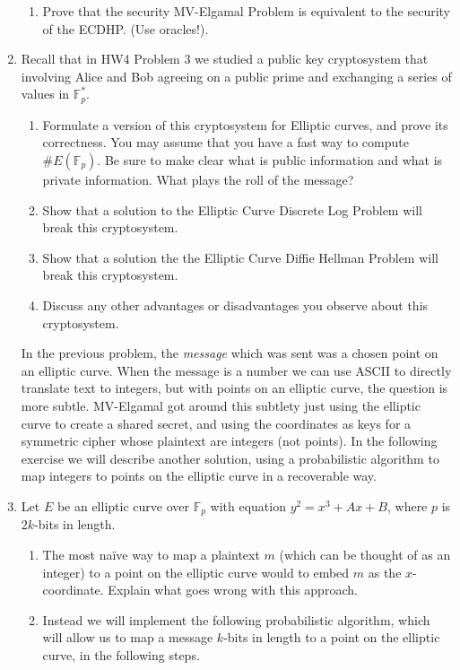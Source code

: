\documentclass[11pt]{article}
\newcommand{\bF}{\mathbb{F}}
\begin{document}
\begin{enumerate}
{\begin{enumerate}
{    }
    \item{
    Prove that the security MV-Elgamal Problem is equivalent to the security of the ECDHP.  (Use oracles!).
    }
  \end{enumerate}
  }
  \item{
  Recall that in HW4 Problem 3 we studied a public key cryptosystem that involving Alice and Bob agreeing on a public prime and exchanging a series of values in $\bF_p^*$.
  \begin{enumerate}
    \item{
    Formulate a version of this cryptosystem for Elliptic curves, and prove its correctness.  You may assume that you have a fast way to compute $\#E(\bF_p)$. Be sure to make clear what is public information and what is private information.  What plays the roll of the message?
    }
    \item{
    Show that a solution to the Elliptic Curve Discrete Log Problem will break this cryptosystem.
    }
    \item{
    Show that a solution the the Elliptic Curve Diffie Hellman Problem will break this cryptosystem.
    }
    \item{
    Discuss any other advantages or disadvantages you observe about this cryptosystem.
    }
  \end{enumerate}
  }
  In the previous problem, the \textit{message} which was sent was a chosen point on an elliptic curve.  When the message is a number we can use ASCII to directly translate text to integers, but with points on an elliptic curve, the question is more subtle.  MV-Elgamal got around this subtlety just using the elliptic curve to create a shared secret, and using the coordinates as keys for a symmetric cipher whose plaintext are integers (not points).  In the following exercise we will describe another solution, using a probabilistic algorithm to map integers to points on the elliptic curve in a recoverable way.
  \item{
  Let $E$ be an elliptic curve over $\bF_p$ with equation $y^2 = x^3 + Ax + B$, where $p$ is $2k$-bits in length.
  \begin{enumerate}
    \item{
    The most na\"ive way to map a plaintext $m$ (which can be thought of as an integer) to a point on the elliptic curve would to embed $m$ as the $x$-coordinate.  Explain what goes wrong with this approach.
    }
    \item{
    Instead we will implement the following probabilistic algorithm, which will allow us to map a message $k$-bits in length to a point on the elliptic curve, in the following steps.
}
\end{enumerate}}
\end{enumerate}
\end{document}
